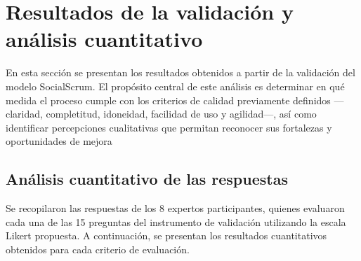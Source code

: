 \section{Resultados de la validación y análisis cuantitativo}
En esta sección se presentan los resultados obtenidos a partir de la validación del modelo SocialScrum. El propósito central de este análisis es determinar en qué medida el proceso cumple con los criterios de calidad previamente definidos —claridad, completitud, idoneidad, facilidad de uso y agilidad—, así como identificar percepciones cualitativas
que permitan reconocer sus fortalezas y oportunidades de mejora

\subsection{Análisis cuantitativo de las respuestas}
Se recopilaron las respuestas de los 8 expertos participantes, quienes evaluaron cada una de las 15 preguntas del instrumento de validación utilizando la escala Likert propuesta. A continuación, se presentan los resultados cuantitativos obtenidos para cada criterio de evaluación.

\begingroup
\scriptsize
\renewcommand{\arraystretch}{1.4}
\setlength{\tabcolsep}{4pt}
\setlength{\LTleft}{0pt}
\setlength{\LTright}{0pt}

